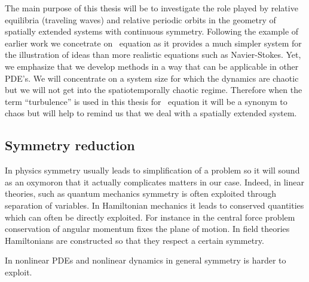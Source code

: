 The main purpose of this thesis will be to investigate the role played by relative equilibria (traveling waves) 
and relative periodic orbits in the geometry of spatially extended systems with continuous symmetry. Following
the example of earlier work we concetrate on \KS\ equation as it provides a much simpler system for the illustration
of ideas than more realistic equations such as Navier-Stokes. Yet, we emphasize that we develop methods in
a way that can be applicable in other PDE's. We will concentrate on a system size for which the dynamics
are chaotic but we will not get into the spatiotemporally chaotic regime. Therefore when the term ``turbulence'' is
used in this thesis for \KS\ equation it will be a synonym to chaos but will help  
to remind us that we deal with a spatially extended system. 

\subsection{Symmetry reduction}

In physics symmetry usually leads to simplification of a problem so it will sound as an oxymoron that it actually
complicates matters in our case. Indeed, in linear theories, such as quantum mechanics symmetry is often exploited
through separation of variables. In Hamiltonian mechanics it leads to conserved quantities which can often be
directly exploited. For instance in the central force problem conservation of angular momentum fixes the plane
of motion. In field theories Hamiltonians are constructed so that they respect a certain symmetry.

In nonlinear PDEs and nonlinear dynamics in general symmetry is harder to exploit.




